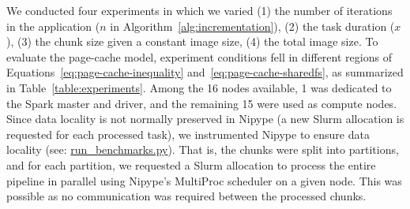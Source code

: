 We conducted four experiments in which we varied (1) the number of 
iterations in the application ($n$ in 
Algorithm~\ref{alg:incrementation}), (2) the task duration ($x$), (3) 
the chunk size given a constant image size, (4) the total image size. To 
evaluate the page-cache model, experiment conditions fell in different 
regions of Equations~\ref{eq:page-cache-inequality} 
and~\ref{eq:page-cache-sharedfs}, as summarized in 
Table~\ref{table:experiments}. Among the 16 nodes available, 1 was 
dedicated to the Spark master and driver, and the remaining 15 were 
used as compute nodes. Since data locality is not normally preserved in 
Nipype (a new Slurm allocation is requested for each processed task), 
we instrumented Nipype to ensure data locality (see: \href{https://github.com/big-data-lab-team/paper-in-mem-locality/blob/master/benchmark\_scripts/run\_benchmarks.py}{run\_benchmarks.py}).
That is, the chunks were split into partitions, and for each partition,
we requested a Slurm allocation to process the entire 
pipeline in parallel using Nipype's MultiProc scheduler on a given 
node. This was possible as no communication was required between the 
processed chunks.

